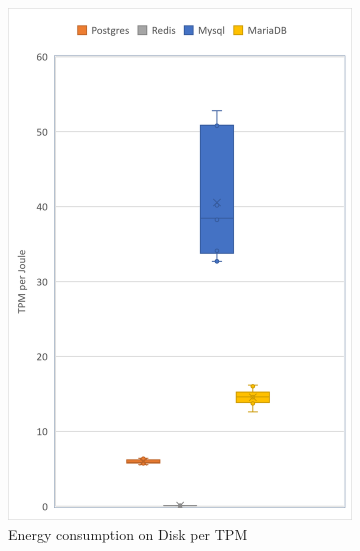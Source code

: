 \begin{figure}[!ht]
\begin{subfigure}[b]{0.30\textwidth}
            \includegraphics[width=1\columnwidth]{results/boxplot/Disk-tpm.png}
            \caption[]%
            {{\small Energy consumption on Disk per TPM}}    
            \label{fig:bocplottransdisk}
        \end{subfigure}
        \begin{subfigure}[b]{0.30\textwidth}  
            \centering 

\end{subfigure}
\end{figure}
